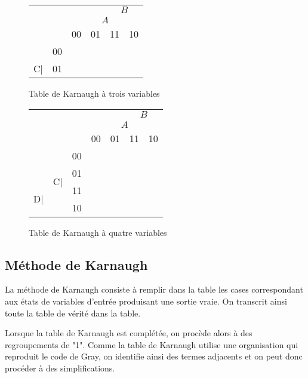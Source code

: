 \documentclass[a4paper,11pt]{book}
\theoremstyle{definition}
\theoremstyle{definition}
\begin{document}
\begin{figure}
  \centering
  \begin{tabular}{|cc|c|c|c|c|}
    \hline
         & & \multicolumn{2}{c}{} & \multicolumn{2}{c|}{\underline{$\:\:\:B\:\:\:$}} \\
         & & \multicolumn{1}{c}{}& \multicolumn{2}{c}{\underline{$\:\:\:A\:\:\:$}} & \\
         & &  00 & 01 & 11 & 10 \\
    \hline 
         & 00 & & & & \\
    \cline{2-6}
         C| & 01 & & & & \\
    \hline
  \end{tabular}
  \caption{Table de Karnaugh à trois variables}
  \label{tab:karnaugh3}
\end{figure}

\begin{figure}
  \centering
  \begin{tabular}{|ccc|c|c|c|c|}
    \hline
         & & & \multicolumn{2}{c}{} & \multicolumn{2}{c|}{\underline{$\:\:\:B\:\:\:$}} \\
         & & & \multicolumn{1}{c}{}& \multicolumn{2}{c}{\underline{$\:\:\:A\:\:\:$}} & \\
         & & &  00 & 01 & 11 & 10 \\
    \hline 
         & & 00 & & & & \\
    \cline{3-7}
         & \multirow{2}{1em}{C|} & 01 & & & & \\
    \cline{3-7}
         \multirow{2}{1em}{D|} & & 11 & & & & \\
    \cline{3-7}
         & & 10 & & & & \\
    \hline
  \end{tabular}
  \caption{Table de Karnaugh à quatre variables}
  \label{tab:karnaugh4}
\end{figure}

\subsection{Méthode de Karnaugh}
La méthode de Karnaugh consiste à remplir dans la table les cases correspondant aux états de variables d'entrée produisant une sortie vraie. On transcrit ainsi toute la table de vérité dans la table.

Lorsque la table de Karnaugh est complétée, on procède alors à des regroupements de "1". Comme la table de Karnaugh utilise une organisation qui reproduit le code de Gray, on identifie ainsi des termes adjacents et on peut donc procéder à des simplifications.
\end{document}

